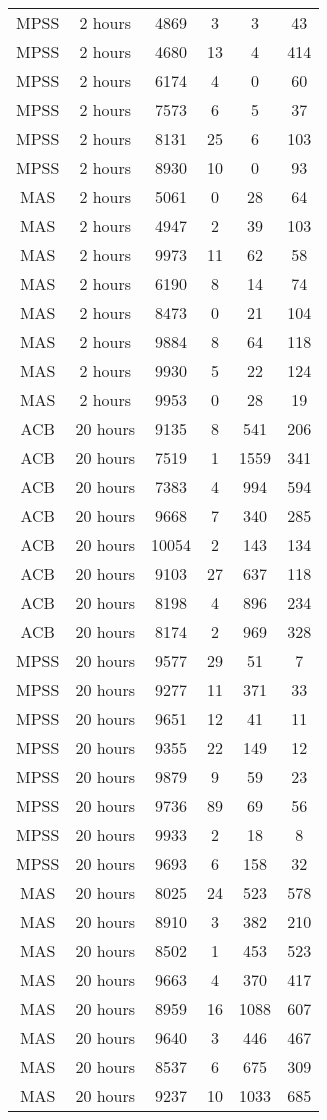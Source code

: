 \begin{center}
\begin{longtable}{cccccc}
MPSS	&	2 hours	&	4869	&	3	&	3	&	43	\\
MPSS	&	2 hours	&	4680	&	13	&	4	&	414	\\
MPSS	&	2 hours	&	6174	&	4	&	0	&	60	\\
MPSS	&	2 hours	&	7573	&	6	&	5	&	37	\\
MPSS	&	2 hours	&	8131	&	25	&	6	&	103	\\
MPSS	&	2 hours	&	8930	&	10	&	0	&	93	\\
MAS	&	2 hours	&	5061	&	0	&	28	&	64	\\
MAS	&	2 hours	&	4947	&	2	&	39	&	103	\\
MAS	&	2 hours	&	9973	&	11	&	62	&	58	\\
MAS	&	2 hours	&	6190	&	8	&	14	&	74	\\
MAS	&	2 hours	&	8473	&	0	&	21	&	104	\\
MAS	&	2 hours	&	9884	&	8	&	64	&	118	\\
MAS	&	2 hours	&	9930	&	5	&	22	&	124	\\
MAS	&	2 hours	&	9953	&	0	&	28	&	19	\\
ACB	&	20 hours	&	9135	&	8	&	541	&	206	\\
ACB	&	20 hours	&	7519	&	1	&	1559	&	341	\\
ACB	&	20 hours	&	7383	&	4	&	994	&	594	\\
ACB	&	20 hours	&	9668	&	7	&	340	&	285	\\
ACB	&	20 hours	&	10054	&	2	&	143	&	134	\\
ACB	&	20 hours	&	9103	&	27	&	637	&	118	\\
ACB	&	20 hours	&	8198	&	4	&	896	&	234	\\
ACB	&	20 hours	&	8174	&	2	&	969	&	328	\\
MPSS	&	20 hours	&	9577	&	29	&	51	&	7	\\
MPSS	&	20 hours	&	9277	&	11	&	371	&	33	\\
MPSS	&	20 hours	&	9651	&	12	&	41	&	11	\\
MPSS	&	20 hours	&	9355	&	22	&	149	&	12	\\
MPSS	&	20 hours	&	9879	&	9	&	59	&	23	\\
MPSS	&	20 hours	&	9736	&	89	&	69	&	56	\\
MPSS	&	20 hours	&	9933	&	2	&	18	&	8	\\
MPSS	&	20 hours	&	9693	&	6	&	158	&	32	\\
MAS	&	20 hours	&	8025	&	24	&	523	&	578	\\
MAS	&	20 hours	&	8910	&	3	&	382	&	210	\\
MAS	&	20 hours	&	8502	&	1	&	453	&	523	\\
MAS	&	20 hours	&	9663	&	4	&	370	&	417	\\
MAS	&	20 hours	&	8959	&	16	&	1088	&	607	\\
MAS	&	20 hours	&	9640	&	3	&	446	&	467	\\
MAS	&	20 hours	&	8537	&	6	&	675	&	309	\\
MAS	&	20 hours	&	9237	&	10	&	1033	&	685	\\

\end{longtable}    
\end{center}

